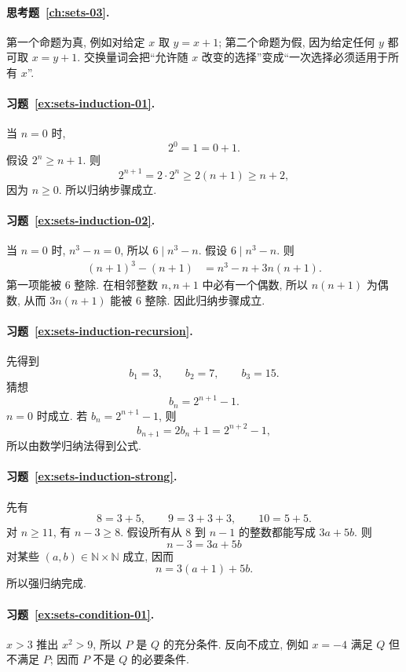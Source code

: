 \documentclass[usesamecnt, thmcnt=section, lang=cn, newtx, 10pt, scheme=chinese]{elegantbook}
\begin{document}
\paragraph*{思考题~\ref{ch:sets-03}.}
第一个命题为真, 例如对给定 $x$ 取 $y=x+1$; 第二个命题为假, 因为给定任何 $y$ 都可取 $x=y+1$. 交换量词会把``允许随 $x$ 改变的选择''变成``一次选择必须适用于所有 $x$''.

\paragraph*{习题~\ref{ex:sets-induction-01}.}
当 $n=0$ 时,
\[
 2^0=1=0+1.
\]
假设 $2^n\geq n+1$. 则
\[
 2^{n+1}=2\cdot2^n\geq2(n+1)\geq n+2,
\]
因为 $n\geq0$. 所以归纳步骤成立.

\paragraph*{习题~\ref{ex:sets-induction-02}.}
当 $n=0$ 时, $n^3-n=0$, 所以 $6\mid n^3-n$. 假设 $6\mid n^3-n$. 则
\[
 \begin{aligned}
 (n+1)^3-(n+1)
 &=n^3-n+3n(n+1).
 \end{aligned}
\]
第一项能被 $6$ 整除. 在相邻整数 $n,n+1$ 中必有一个偶数, 所以 $n(n+1)$ 为偶数, 从而 $3n(n+1)$ 能被 $6$ 整除. 因此归纳步骤成立.

\paragraph*{习题~\ref{ex:sets-induction-recursion}.}
先得到
\[
 b_1=3,\qquad b_2=7,\qquad b_3=15.
\]
猜想
\[
 b_n=2^{n+1}-1.
\]
$n=0$ 时成立. 若 $b_n=2^{n+1}-1$, 则
\[
 b_{n+1}
 =2b_n+1
 =2^{n+2}-1,
\]
所以由数学归纳法得到公式.

\paragraph*{习题~\ref{ex:sets-induction-strong}.}
先有
\[
 8=3+5,\qquad 9=3+3+3,\qquad 10=5+5.
\]
对 $n\geq11$, 有 $n-3\geq8$. 假设所有从 $8$ 到 $n-1$ 的整数都能写成 $3a+5b$. 则
\[
 n-3=3a+5b
\]
对某些 $(a,b)\in\mathbb N\times\mathbb N$ 成立, 因而
\[
 n=3(a+1)+5b.
\]
所以强归纳完成.

\paragraph*{习题~\ref{ex:sets-condition-01}.}
$x>3$ 推出 $x^2>9$, 所以 $P$ 是 $Q$ 的充分条件. 反向不成立, 例如 $x=-4$ 满足 $Q$ 但不满足 $P$; 因而 $P$ 不是 $Q$ 的必要条件.
\end{document}

